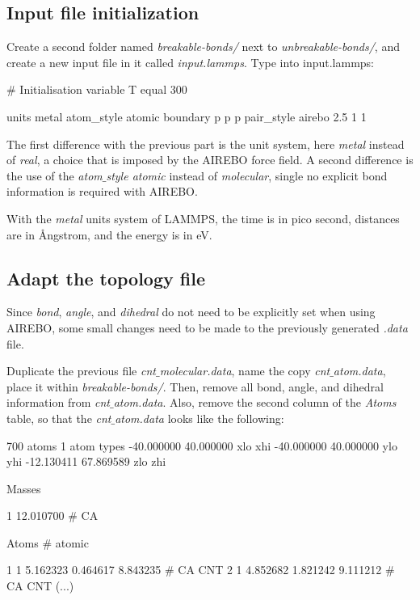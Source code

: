 \subsection{Input file initialization}
\noindent Create a second folder named \textit{breakable-bonds/} next to \textit{unbreakable-bonds/},
and create a new input file in it called \textit{input.lammps}. Type into input.lammps:

\begin{lcverbatim}
# Initialisation
variable T equal 300

units metal
atom_style atomic
boundary p p p
pair_style airebo 2.5 1 1
\end{lcverbatim}

\noindent The first difference with the previous part
is the unit system, here \textit{metal} instead of \textit{real}, a choice
that is imposed by the AIREBO force field. A second difference
is the use of the \textit{atom$\_$style atomic} instead of \textit{molecular},
single no explicit bond information is required with AIREBO.

\begin{tcolorbox}[colback=mylightblue!5!white,colframe=mylightblue!75!black,title=About metal units]

\vspace{0.25cm} \noindent With the \textit{metal} units system of LAMMPS, the time is in pico second, 
distances are in Ångstrom, and the energy is in eV.
\end{tcolorbox}

\subsection{Adapt the topology file}
Since \textit{bond}, \textit{angle}, and \textit{dihedral} do not need to be explicitly
set when using AIREBO, some small changes need to be made to the 
previously generated \textit{.data} file.

\vspace{0.25cm} \noindent Duplicate the previous file \textit{cnt$\_$molecular.data}, name the copy \textit{cnt$\_$atom.data},
place it within \textit{breakable-bonds/}. Then, remove all bond, angle, and dihedral 
information from \textit{cnt$\_$atom.data}. Also, remove the second column of the 
\textit{Atoms} table, so that the \textit{cnt$\_$atom.data} looks like the following: 

\begin{lcverbatim}
700 atoms
1 atom types
-40.000000 40.000000  xlo xhi
-40.000000 40.000000  ylo yhi
-12.130411 67.869589  zlo zhi

Masses

1 12.010700 # CA

Atoms # atomic

1 1 5.162323 0.464617 8.843235 # CA CNT
2 1 4.852682 1.821242 9.111212 # CA CNT
(...)
\end{lcverbatim}


